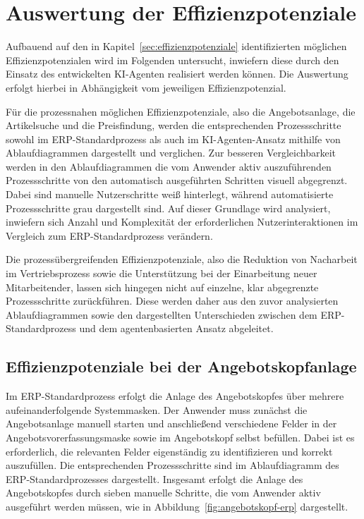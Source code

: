 \section{Auswertung der Effizienzpotenziale}

Aufbauend auf den in Kapitel~\ref{sec:effizienzpotenziale} identifizierten möglichen Effizienzpotenzialen wird im Folgenden untersucht, inwiefern diese durch den Einsatz des entwickelten \ac{KI}-Agenten realisiert werden können. Die Auswertung erfolgt hierbei in Abhängigkeit vom jeweiligen Effizienzpotenzial.

Für die prozessnahen möglichen Effizienzpotenziale, also die Angebotsanlage, die Artikelsuche und die Preisfindung, werden die entsprechenden Prozessschritte sowohl im \ac{ERP}-Standardprozess als auch im \ac{KI}-Agenten-Ansatz mithilfe von Ablaufdiagrammen dargestellt und verglichen. Zur besseren Vergleichbarkeit werden in den Ablaufdiagrammen die vom Anwender aktiv auszuführenden Prozessschritte von den automatisch ausgeführten Schritten visuell abgegrenzt. Dabei sind manuelle Nutzerschritte weiß hinterlegt, während automatisierte Prozessschritte grau dargestellt sind. Auf dieser Grundlage wird analysiert, inwiefern sich Anzahl und Komplexität der erforderlichen Nutzerinteraktionen im Vergleich zum \ac{ERP}-Standardprozess verändern.

Die prozessübergreifenden Effizienzpotenziale, also die Reduktion von Nacharbeit im Vertriebsprozess sowie die Unterstützung bei der Einarbeitung neuer Mitarbeitender, lassen sich hingegen nicht auf einzelne, klar abgegrenzte Prozessschritte zurückführen. Diese werden daher aus den zuvor analysierten Ablaufdiagrammen sowie den dargestellten Unterschieden zwischen dem \ac{ERP}-Standardprozess und dem agentenbasierten Ansatz abgeleitet.

\subsection{Effizienzpotenziale bei der Angebotskopfanlage}

Im \ac{ERP}-Standardprozess erfolgt die Anlage des Angebotskopfes über mehrere aufeinanderfolgende Systemmasken. Der Anwender muss zunächst die Angebotsanlage manuell starten und anschließend verschiedene Felder in der Angebotsvorerfassungsmaske sowie im Angebotskopf selbst befüllen. Dabei ist es erforderlich, die relevanten Felder eigenständig zu identifizieren und korrekt auszufüllen. Die entsprechenden Prozessschritte sind im Ablaufdiagramm des \ac{ERP}-Standardprozesses dargestellt. Insgesamt erfolgt die Anlage des Angebotskopfes durch sieben manuelle Schritte, die vom Anwender aktiv ausgeführt werden müssen, wie in Abbildung~\ref{fig:angebotskopf-erp} dargestellt.

